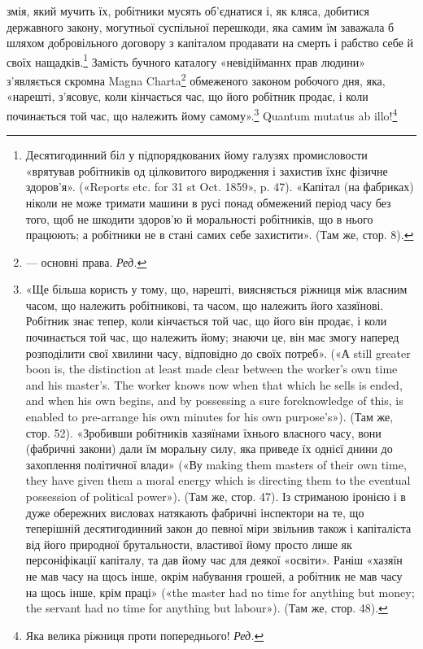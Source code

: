 змія, який мучить їх, робітники мусять об’єднатися і, як кляса,
добитися державного закону, могутньої суспільної перешкоди,
яка самим їм заважала б шляхом добровільного договору з капіталом
продавати на смерть і рабство себе й своїх нащадків.\footnote{
Десятигодинний біл у підпорядкованих йому галузях промисловости
«врятував робітників од цілковитого виродження і захистив їхнє
фізичне здоров’я». («Reports etc. for 31 st Oct. 1859», p. 47). «Капітал
(на фабриках) ніколи не може тримати машини в русі понад обмежений
період часу без того, щоб не шкодити здоров’ю й моральності робітників,
що в нього працюють; а робітники не в стані самих себе захистити».
(Там же, стор. 8).
}
Замість бучного каталогу «невідійманнх прав людини» з’являється
скромна Magna Charta\footnote*{
— основні права. \emph{Ред.}
} обмеженого законом робочого
дня, яка, «нарешті, з’ясовує, коли кінчається час, що його робітник
продає, і коли починається той час, що належить йому самому».\footnote{
«Ще більша користь у тому, що, нарешті, виясняється ріжниця
між власним часом, що належить робітникові, та часом, що належить
його хазяїнові. Робітник знає тепер, коли кінчається той час, що його
він продає, і коли починається той час, що належить йому; знаючи це,
він має змогу наперед розподілити свої хвилини часу, відповідно до своїх
потреб». («А still greater boon is, the distinction at least made clear between
the worker’s own time and his master’s. The worker knows now when
that which he sells is ended, and when his own begins, and by possessing a sure
foreknowledge of this, is enabled to pre-arrange his own minutes for his
own purpose’s»). (Там же, стор. 52). «Зробивши робітників хазяїнами
їхнього власного часу, вони (фабричні закони) дали їм моральну силу,
яка приведе їх однієї днини до захоплення політичної влади» («Ву
making them masters of their own time, they have given them a moral energy
which is directing them to the eventual possession of political power»).
(Там же, стор. 47). Із стриманою іронією і в дуже обережних висловах
натякають фабричні інспектори на те, що теперішній десятигодинний
закон до певної міри звільнив також і капіталіста від його природної
брутальности, властивої йому просто лише як персоніфікації капіталу, та
дав йому час для деякої «освіти». Раніш «хазяїн не мав часу на щось
інше, окрім набування грошей, а робітник не мав часу на щось інше,
крім праці» («the master had no time for anything but money; the servant
had no time for anything but labour»). (Там же, стор. 48).
}
Quantum mutatus ab illo!\footnote*{
Яка велика ріжниця проти попереднього! \emph{Ред.}
}
